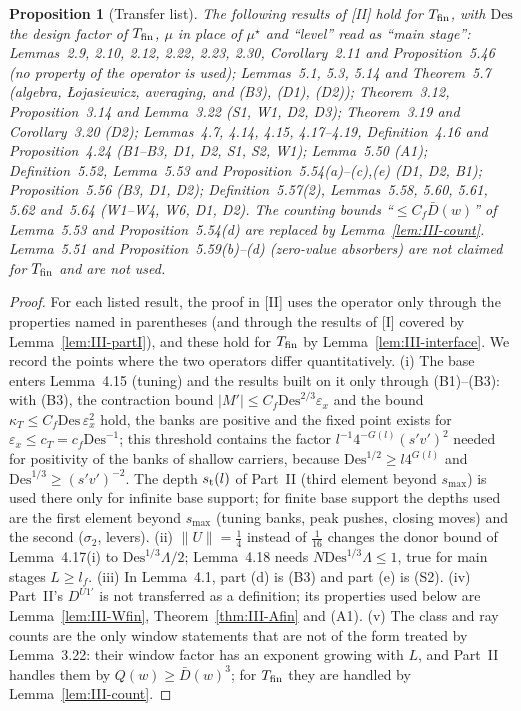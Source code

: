 \documentclass[10pt]{amsart}
\newtheorem{proposition}[theorem]{Proposition}
\theoremstyle{definition}
\theoremstyle{remark}
\begin{document}
\begin{proposition}[Transfer list]\label{prop:III-transfer}
The following results of [II] hold for $T_{\rm fin}$, with $\mathrm{Des}$ the design
factor of $T_{\rm fin}$, $\mu$ in place of $\mu^\star$ and ``level'' read as
``main stage'': Lemmas~2.9, 2.10, 2.12, 2.22, 2.23, 2.30, Corollary~2.11 and
Proposition~5.46 \textup{(}no property of the operator is used\textup{)};
Lemmas~5.1, 5.3, 5.14 and Theorem~5.7 \textup{(}algebra, {\L}ojasiewicz,
averaging, and \textup{(B3), (D1), (D2)}\textup{)}; Theorem~3.12, Proposition~3.14
and Lemma~3.22 \textup{(S1, W1, D2, D3)}; Theorem~3.19 and Corollary~3.20
\textup{(D2)}; Lemmas~4.7, 4.14, 4.15, 4.17--4.19, Definition~4.16 and
Proposition~4.24 \textup{(B1--B3, D1, D2, S1, S2, W1)}; Lemma~5.50 \textup{(A1)};
Definition~5.52, Lemma~5.53 and Proposition~5.54(a)--(c),(e) \textup{(D1, D2,
B1)}; Proposition~5.56 \textup{(B3, D1, D2)}; Definition~5.57(2), Lemmas~5.58,
5.60, 5.61, 5.62 and~5.64 \textup{(W1--W4, W6, D1, D2)}.  The counting bounds
``$\le C_f\bar D(w)$'' of Lemma~5.53 and Proposition~5.54(d) are replaced by
Lemma~\textup{\ref{lem:III-count}}.  Lemma~5.51 and Proposition~5.59(b)--(d)
\textup{(}zero-value absorbers\textup{)} are not claimed for $T_{\rm fin}$ and are
not used.
\end{proposition}

\begin{proof}
For each listed result, the proof in [II] uses the operator only through the
properties named in parentheses (and through the results of [I] covered by
Lemma~\ref{lem:III-partI}), and these hold for $T_{\rm fin}$ by
Lemma~\ref{lem:III-interface}.  We record the points where the two operators
differ quantitatively.  (i) The base enters Lemma~4.15 (tuning) and the
results built on it only through (B1)--(B3): with (B3), the contraction bound
$|M'|\le C_f\mathrm{Des}^{2/3}\varepsilon_x$ and the bound $\kappa_T\le C_f\mathrm{Des}\,
\varepsilon_x^2$ hold, the banks are positive and the fixed point exists for
$\varepsilon_x\le c_T=c_f\mathrm{Des}^{-1}$; this threshold contains the factor
$l^{-1}4^{-G(l)}(s'v')^2$ needed for positivity of the banks of shallow
carriers, because $\mathrm{Des}^{1/2}\ge l4^{G(l)}$ and $\mathrm{Des}^{1/3}\ge(s'v')^{-2}$.
The depth $s_{\rm t}(l)$ of Part~II (third element beyond $s_{\max}$) is used
there only for infinite base support; for finite base support the depths used
are the first element beyond $s_{\max}$ (tuning banks, peak pushes, closing
moves) and the second ($\sigma_2$, levers).  (ii) $\|U\|=\frac14$ instead of
$\frac1{16}$ changes the donor bound of Lemma~4.17(i) to $\mathrm{Des}^{1/3}
\Lambda/2$; Lemma~4.18 needs $N\mathrm{Des}^{1/3}\Lambda\le1$, true for main stages
$L\ge l_f$.  (iii) In Lemma~4.1, part (d) is (B3) and part (e) is (S2).
(iv) Part~II's $D^{U1'}$ is not transferred as a definition; its properties
used below are Lemma~\ref{lem:III-Wfin}, Theorem~\ref{thm:III-Afin} and (A1).
(v) The class and ray counts are the only window statements that are not of
the form treated by Lemma~3.22: their window factor has an exponent growing
with $L$, and Part~II handles them by $Q(w)\ge\bar D(w)^3$; for $T_{\rm fin}$
they are handled by Lemma~\ref{lem:III-count}.
\end{proof}
\end{document}
